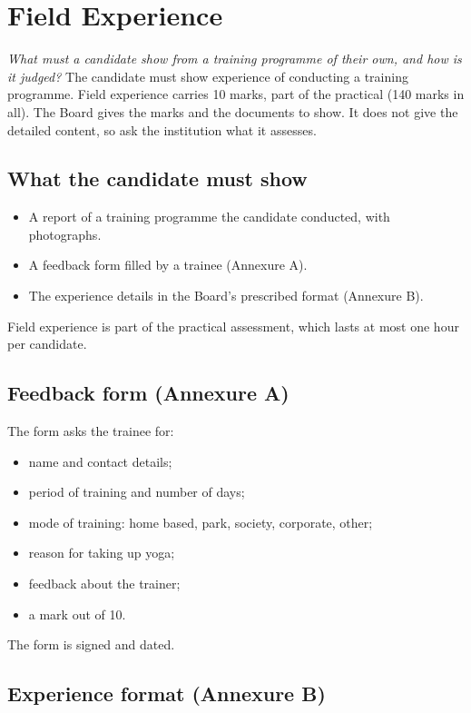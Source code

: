 \chapter{Field Experience}\label{ch:field-experience}

\emph{What must a candidate show from a training programme of their own, and how is it judged?}
The candidate must show experience of conducting a training programme. Field experience carries 10 marks, part of the practical (140 marks in all). The Board gives the marks and the documents to show. It does not give the detailed content, so ask the institution what it assesses.

\section*{What the candidate must show}

\begin{itemize}
\item A report of a training programme the candidate conducted, with photographs.
\item A feedback form filled by a trainee (Annexure A).
\item The experience details in the Board's prescribed format (Annexure B).
\end{itemize}

Field experience is part of the practical assessment, which lasts at most one hour per candidate.

\section*{Feedback form (Annexure A)}

The form asks the trainee for:
\begin{itemize}
\item name and contact details;
\item period of training and number of days;
\item mode of training: home based, park, society, corporate, other;
\item reason for taking up yoga;
\item feedback about the trainer;
\item a mark out of 10.
\end{itemize}

The form is signed and dated.

\section*{Experience format (Annexure B)}


